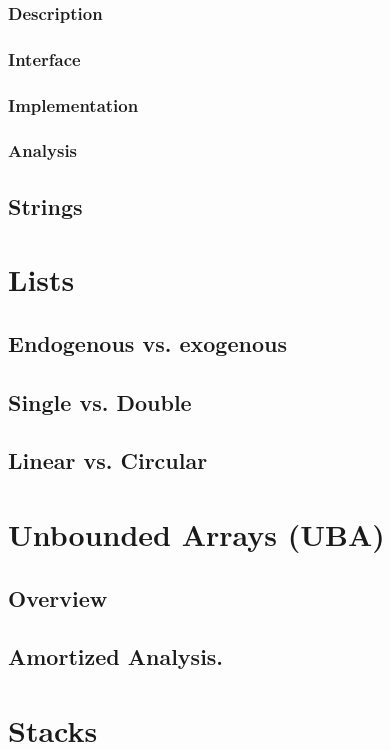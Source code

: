 \documentclass[12pt, letterpaper]{book}
\begin{document}
	\subsubsection{Description}
	\subsubsection{Interface}
	\subsubsection{Implementation}
	\subsubsection{Analysis}

	\subsection{Strings}

\section{Lists} \label{lists}

	\subsection{Endogenous vs. exogenous}
	\subsection{Single vs. Double}
	\subsection{Linear vs. Circular}

\section{Unbounded Arrays (UBA)}

	\subsection{Overview}
	\subsection{Amortized Analysis.}

\section{Stacks}
\end{document}
